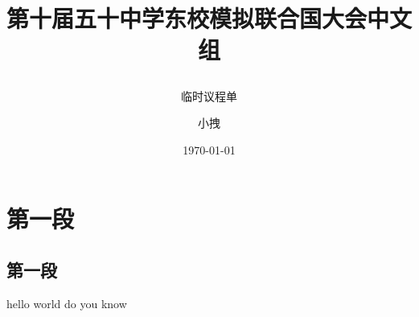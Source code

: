 \documentclass{article}
\title{第十届五十中学东校模拟联合国大会中文组 \\ \subtitle{临时议程单}}
\date{\today}
\author{小拽}
\begin{document}
\newpage
\maketitle
\section{第一段}
\subsection{第一段}
hello world do you know
\end{document}
